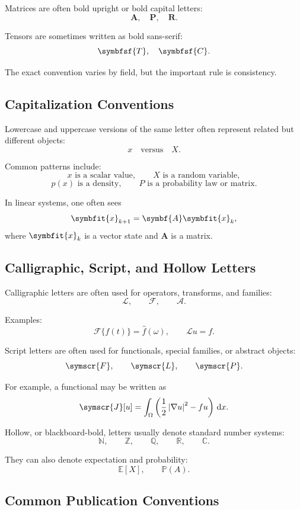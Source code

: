 \documentclass[11pt,twocolumn]{article}
\newcommand{\vct}[1]{\symbfit{#1}}   %
\newcommand{\mat}[1]{\symbf{#1}}     %
\newcommand{\ten}[1]{\symbfsf{#1}}   %
\newcommand{\abs}[1]{\left\lvert #1 \right\rvert}
\newcommand{\dd}{\,\mathrm{d}}
\newcommand{\grad}{\nabla}
\newcommand{\fourier}[1]{\widehat{#1}}
\begin{document}
Matrices are often bold upright or bold capital letters:
\[
\mat{A},\quad \mat{P},\quad \mat{R}.
\]

Tensors are sometimes written as bold sans-serif:
\[
\ten{T},\quad \ten{C}.
\]

The exact convention varies by field, but the important rule is consistency.

\subsection{Capitalization Conventions}

Lowercase and uppercase versions of the same letter often represent related
but different objects:
\[
x
\quad
\text{versus}
\quad
X.
\]

Common patterns include:
\[
x \text{ is a scalar value},
\qquad
X \text{ is a random variable},
\]
\[
p(x) \text{ is a density},
\qquad
P \text{ is a probability law or matrix}.
\]

In linear systems, one often sees
\[
\vct{x}_{k+1} = \mat{A}\vct{x}_k,
\]
where \(\vct{x}_k\) is a vector state and \(\mat{A}\) is a matrix.

\subsection{Calligraphic, Script, and Hollow Letters}

Calligraphic letters are often used for operators, transforms, and families:
\[
\mathcal{L},
\qquad
\mathcal{F},
\qquad
\mathcal{A}.
\]

Examples:
\[
\mathcal{F}\{f(t)\}
=
\fourier{f}(\omega),
\qquad
\mathcal{L}u=f.
\]

Script letters are often used for functionals, special families, or abstract
objects:
\[
\symscr{F},
\qquad
\symscr{L},
\qquad
\symscr{P}.
\]

For example, a functional may be written as
\[
\symscr{J}[u]
=
\int_{\Omega}
\left(
\frac{1}{2}\abs{\grad u}^{2}
-
fu
\right)\dd x.
\]

Hollow, or blackboard-bold, letters usually denote standard number systems:
\[
\mathbb{N},
\qquad
\mathbb{Z},
\qquad
\mathbb{Q},
\qquad
\mathbb{R},
\qquad
\mathbb{C}.
\]

They can also denote expectation and probability:
\[
\mathbb{E}[X],
\qquad
\mathbb{P}(A).
\]

\subsection{Common Publication Conventions}
\end{document}

